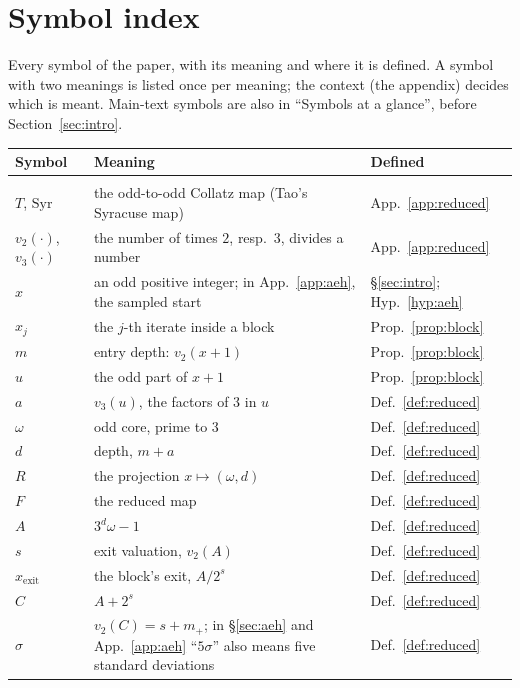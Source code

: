 \documentclass[11pt]{article}
\theoremstyle{remark}
\newcommand{\vt}[1]{v_2\!\left(#1\right)}
\newcommand{\vth}[1]{v_3\!\left(#1\right)}
\newcommand{\w}{\omega}
\begin{document}
\section{Symbol index}\label{app:symbols}

Every symbol of the paper, with its meaning and where it is defined. A symbol with two meanings is listed once per meaning; the context (the appendix) decides which is meant. Main-text symbols are also in ``Symbols at a glance'', before Section~\ref{sec:intro}.

{\small
\begin{longtable}{>{\raggedright\arraybackslash}p{}>{\raggedright\arraybackslash}p{}>{\raggedright\arraybackslash}p{}}
\hline
Symbol & Meaning & Defined \\
\hline
\endhead
\multicolumn{3}{l}{\emph{The map, blocks and states}} \\
$T$, $\mathrm{Syr}$ & the odd-to-odd Collatz map (Tao's Syracuse map) & App.~\ref{app:reduced} \\
$\vt{\cdot}$, $\vth{\cdot}$ & the number of times $2$, resp.\ $3$, divides a number & App.~\ref{app:reduced} \\
$x$ & an odd positive integer; in App.~\ref{app:aeh}, the sampled start & \S\ref{sec:intro}; Hyp.~\ref{hyp:aeh} \\
$x_j$ & the $j$-th iterate inside a block & Prop.~\ref{prop:block} \\
$m$ & entry depth: $\vt{x+1}$ & Prop.~\ref{prop:block} \\
$u$ & the odd part of $x+1$ & Prop.~\ref{prop:block} \\
$a$ & $\vth{u}$, the factors of $3$ in $u$ & Def.~\ref{def:reduced} \\
$\w$ & odd core, prime to $3$ & Def.~\ref{def:reduced} \\
$d$ & depth, $m + a$ & Def.~\ref{def:reduced} \\
$R$ & the projection $x \mapsto (\w, d)$ & Def.~\ref{def:reduced} \\
$F$ & the reduced map & Def.~\ref{def:reduced} \\
$A$ & $3^d\w - 1$ & Def.~\ref{def:reduced} \\
$s$ & exit valuation, $\vt{A}$ & Def.~\ref{def:reduced} \\
$x_{\mathrm{exit}}$ & the block's exit, $A/2^s$ & Def.~\ref{def:reduced} \\
$C$ & $A + 2^s$ & Def.~\ref{def:reduced} \\
$\sigma$ & $\vt{C} = s + m_+$; in \S\ref{sec:aeh} and App.~\ref{app:aeh} ``$5\sigma$'' also means five standard deviations & Def.~\ref{def:reduced} \\

\end{longtable}}
\end{document}
